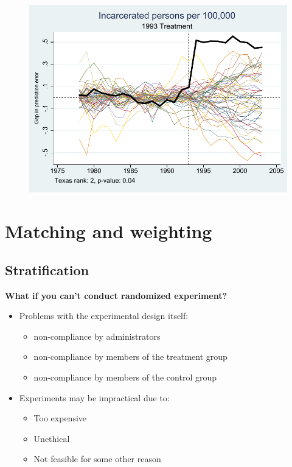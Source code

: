 \documentclass[notes=show]{beamer}
\begin{document}
\begin{frame}[shrink=30,plain]

\begin{figure}
\includegraphics{./lecture_includes/synth_placebo_totalincarceration1993.pdf}
\end{figure}
\end{frame}


\section{Matching and weighting}

\subsection{Stratification}

\begin{frame}
	\begin{center}
	\textbf{What if you can't conduct randomized experiment?}
	\end{center}

	\begin{itemize}
	\item Problems with the experimental design itself:
		\begin{itemize}
		\item non-compliance by administrators 
		\item non-compliance by members of the treatment group
		\item non-compliance by members of the control group
		\end{itemize}
	\item  Experiments may be impractical due to:
		\begin{itemize}
		\item Too expensive
		\item Unethical
		\item Not feasible for some other reason
		\end{itemize}
	\end{itemize}

\end{frame}
\end{document}
